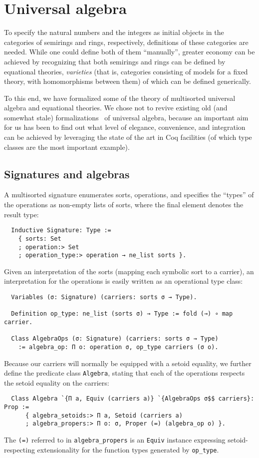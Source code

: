 \documentclass[a4paper,10pt,runningheads]{llncs}
\begin{document}
\section{Universal algebra}\label{univ}

To specify the natural numbers and the integers as initial objects in the categories of semirings and rings, respectively, definitions of these categories are needed. While one could define both of them ``manually'', greater economy can be achieved by recognizing that both semirings and rings can be defined by equational theories, \emph{varieties} (that is, categories consisting of models for a fixed theory, with homomorphisms between them) of which can be defined generically.

To this end, we have formalized some of the theory of multisorted universal algebra and equational theories. We chose not to revive existing old (and somewhat stale) formalizations~\cite{DBLP:conf/tphol/Capretta99,dominguez2008formalizing} of universal algebra, because an important aim for us has been to find out what level of elegance, convenience, and integration can be achieved by leveraging the state of the art in Coq facilities (of which type classes are the most important example).

\subsection{Signatures and algebras}

A multisorted signature enumerates sorts, operations, and specifies the ``types'' of the operations as non-empty lists of sorts, where the final element denotes the result type:
\begin{lstlisting}
  Inductive Signature: Type :=
    { sorts: Set
    ; operation:> Set
    ; operation_type:> operation → ne_list sorts }.
\end{lstlisting}
Given an interpretation of the sorts (mapping each symbolic sort to a carrier), an interpretation for the operations is easily written as an operational type class:
\begin{lstlisting}
  Variables (σ: Signature) (carriers: sorts σ → Type).

  Definition op_type: ne_list (sorts σ) → Type := fold (→) ∘ map carrier.

  Class AlgebraOps (σ: Signature) (carriers: sorts σ → Type)
    := algebra_op: Π o: operation σ, op_type carriers (σ o).
\end{lstlisting}
Because our carriers will normally be equipped with a setoid equality, we further define the predicate class \lstinline|Algebra|, stating that each of the operations respects the setoid equality on the carriers:
\begin{lstlisting}
  Class Algebra `{Π a, Equiv (carriers a)} `{AlgebraOps σ$$ carriers}: Prop :=
      { algebra_setoids:> Π a, Setoid (carriers a)
      ; algebra_propers:> Π o: σ, Proper (=) (algebra_op o) }.
\end{lstlisting}
The \lstinline|(=)| referred to in \lstinline|algebra_propers| is an \lstinline|Equiv| instance expressing setoid-respecting extensionality for the function types generated by \lstinline|op_type|.
\end{document}

